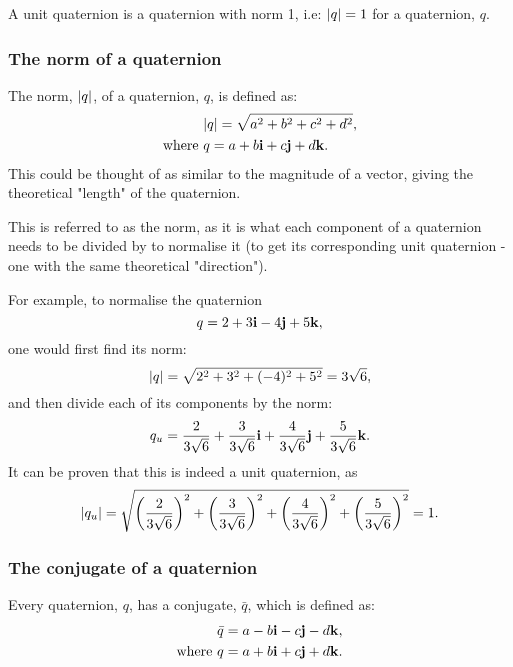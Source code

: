 \documentclass[10pt]{article}
\begin{document}
A unit quaternion is a quaternion with norm 1, i.e: $\abs{q} = 1$ for a quaternion, $q$. \cite{DRose}

\subsubsection{The norm of a quaternion}

The norm, $\abs{q}$, of a quaternion, $q$, is defined as:
\begin{equation}
    \begin{aligned}
        &\abs{q} = \sqrt{a^2 + b^2 + c^2 + d^2}, \\
        \text{where } & q = a + b\vb{i} + c\vb{j} + d\vb{k}.
    \end{aligned} 
\end{equation}
This could be thought of as similar to the magnitude of a vector, giving the theoretical "length" of the quaternion. \cite{Math431}

This is referred to as the norm, as it is what each component of a quaternion needs to be divided by to normalise it (to get its corresponding unit quaternion - one with the same theoretical "direction").

For example, to normalise the quaternion
\begin{equation}
    q = 2 + 3\vb{i} - 4\vb{j} + 5\vb{k},
\end{equation}
one would first find its norm:
\begin{equation}
    \abs{q} = \sqrt{2^2 + 3^2 + (-4)^2 + 5^2} = 3\sqrt{6},
\end{equation}
and then divide each of its components by the norm:
\begin{equation}
    q_u = \frac{2}{3\sqrt{6}}+\frac{3}{3\sqrt{6}}\vb{i}+\frac{4}{3\sqrt{6}}\vb{j}+\frac{5}{3\sqrt{6}}\vb{k}.
\end{equation}
It can be proven that this is indeed a unit quaternion, as
\begin{equation}
    \abs{q_u} = \sqrt{\left(\frac{2}{3\sqrt{6}}\right)^2+\left(\frac{3}{3\sqrt{6}}\right)^2+\left(\frac{4}{3\sqrt{6}}\right)^2+\left(\frac{5}{3\sqrt{6}}\right)^2} = 1.
\end{equation}

\subsubsection{The conjugate of a quaternion} \label{qBarDef}

Every quaternion, $q$, has a conjugate, $\bar{q}$, which is defined as: \cite{DRose}
\begin{equation}
    \begin{aligned}
        &\bar{q} = a - b\vb{i} - c\vb{j} - d\vb{k}, \\
        \text{where } & q = a + b\vb{i} + c\vb{j} + d\vb{k}.
    \end{aligned}
\end{equation}
\end{document}
